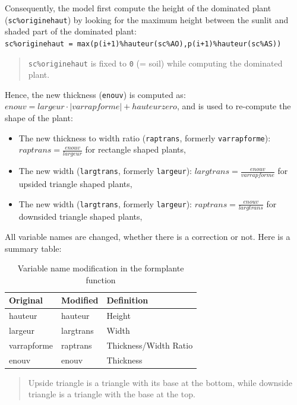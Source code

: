 \documentclass[
]{book}
\providecommand{\tightlist}{%
  \setlength{\itemsep}{0pt}\setlength{\parskip}{0pt}}
\begin{document}
Consequently, the model first compute the height of the dominated plant (\texttt{sc\%originehaut}) by looking for the maximum height between the sunlit and shaded part of the dominated plant:\\
\texttt{sc\%originehaut\ =\ max(p(i+1)\%hauteur(sc\%AO),p(i+1)\%hauteur(sc\%AS))}

\begin{quote}
\texttt{sc\%originehaut} is fixed to \texttt{0} (= soil) while computing the dominated plant.
\end{quote}

Hence, the new thickness (\texttt{enouv}) is computed as: \(enouv=largeur\cdot\left|varrapforme\right|+hauteurzero\), and is used to re-compute the shape of the plant:

\begin{itemize}
\tightlist
\item
  The new thickness to width ratio (\texttt{raptrans}, formerly \texttt{varrapforme}): \(raptrans=\frac{enouv}{largeur}\) for rectangle shaped plants,
\item
  The new width (\texttt{largtrans}, formerly \texttt{largeur}): \(largtrans=\frac{enouv}{varrapforme}\) for upsided triangle shaped plants,
\item
  The new width (\texttt{largtrans}, formerly \texttt{largeur}): \(raptrans=\frac{enouv}{largtrans}\) for downsided triangle shaped plants,
\end{itemize}

All variable names are changed, whether there is a correction or not. Here is a summary table:

\begin{table}

\caption{\label{tab:varmatch}Variable name modification in the formplante function}
\centering
\begin{tabular}[t]{l|l|l}
\hline
Original & Modified & Definition\\
\hline
hauteur & hauteur & Height\\
\hline
largeur & largtrans & Width\\
\hline
varrapforme & raptrans & Thickness/Width Ratio\\
\hline
enouv & enouv & Thickness\\
\hline
\end{tabular}
\end{table}

\begin{quote}
Upside triangle is a triangle with its base at the bottom, while downside triangle is a triangle with the base at the top.
\end{quote}
\end{document}
